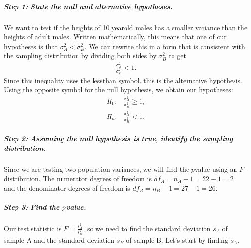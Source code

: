 \documentclass[letterpaper,10pt,english]{jupyterBook}
\begin{document}
\subparagraph{Step 1: State the null and alternative hypotheses.}
\label{\detokenize{Ch9 Hypothesis Tests of Two or More Populations/9.2 Hypothesis Testing Two Population Variances:step-1-state-the-null-and-alternative-hypotheses}}
\sphinxAtStartPar
We want to test if the heights of 10 year\sphinxhyphen{}old males has a smaller variance than the heights of adult males. Written mathematically, this means that one of our hypotheses is that \(\sigma_A^2 < \sigma_B^2\). We can rewrite this in a form that is consistent with the sampling distribution by dividing both sides by \(\sigma_B^2\) to get
\begin{equation*}
\begin{split}\frac{\sigma_A^2}{\sigma_B^2} < 1.\end{split}
\end{equation*}
\sphinxAtStartPar
Since this inequality uses the less\sphinxhyphen{}than symbol, this is the alternative hypothesis. Using the opposite symbol for the null hypothesis, we obtain our hypotheses:
\begin{align*}
H_0:& \frac{\sigma_A^2}{\sigma_B^2} \geq 1, \\
H_a:& \frac{\sigma_A^2}{\sigma_B^2} < 1.
\end{align*}

\subparagraph{Step 2: Assuming the null hypothesis is true, identify the sampling distribution.}
\label{\detokenize{Ch9 Hypothesis Tests of Two or More Populations/9.2 Hypothesis Testing Two Population Variances:step-2-assuming-the-null-hypothesis-is-true-identify-the-sampling-distribution}}
\sphinxAtStartPar
Since we are testing two population variances, we will find the \(p\)\sphinxhyphen{}value using an \(F\)\sphinxhyphen{}distribution. The numerator degrees of freedom is \(df_A = n_A - 1 = 22 - 1 = 21\) and the denominator degrees of freedom is \(df_B = n_B - 1 = 27 - 1 = 26\).


\subparagraph{Step 3: Find the \protect\(p\protect\)\sphinxhyphen{}value.}
\label{\detokenize{Ch9 Hypothesis Tests of Two or More Populations/9.2 Hypothesis Testing Two Population Variances:step-3-find-the-p-value}}
\sphinxAtStartPar
Our test statistic is \(F = \frac{s_A^2}{s_B^2}\), so we need to find the standard deviation \(s_A\) of sample A and the standard deviation \(s_B\) of sample B. Let’s start by finding \(s_A\).
\end{document}
